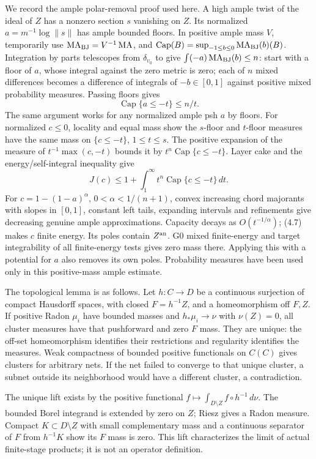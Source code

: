 \documentclass[
  10pt,
]{article}
\begin{document}
We record the ample polar-removal proof used here. A high ample twist of
the ideal of \(Z\) has a nonzero section \(s\) vanishing on \(Z\). Its
normalized \(a=m^{-1}\log\|s\|\) has ample bounded floors. In positive
ample mass \(V\), temporarily use
\(\operatorname{MA}_{\rm BJ}=V^{-1}\operatorname{MA}\), and
\(\operatorname{Cap}(B)=\sup_{-1\le b\le0}\operatorname{MA}_{\rm BJ}(b)(B)\).
Integration by parts telescopes from \(\delta_{v_0}\) to give
\(\int(-a)\operatorname{MA}_{\rm BJ}(b)\le n\): start with a floor of
\(a\), whose integral against the zero metric is zero; each of \(n\)
mixed differences becomes a difference of integrals of \(-b\in[0,1]\)
against positive mixed probability measures. Passing floors gives
\[\operatorname{Cap}\{a\le-t\}\le n/t. \tag{4.6}\] The same argument
works for any normalized ample psh \(a\) by floors. For normalized
\(c\le0\), locality and equal mass show the \(s\)-floor and \(t\)-floor
measures have the same mass on \(\{c\le-t\}\), \(1\le t\le s\). The
positive expansion of the measure of \(t^{-1}\max(c,-t)\) bounds it by
\(t^n\operatorname{Cap}\{c\le-t\}\). Layer cake and the
energy/self-integral inequality give
\[J(c)\le1+\int_1^\infty t^n\operatorname{Cap}\{c\le-t\}\,dt. \tag{4.7}\]
For \(c=1-(1-a)^\alpha\), \(0<\alpha<1/(n+1)\), convex increasing chord
majorants with slopes in \([0,1]\), constant left tails, expanding
intervals and refinements give decreasing genuine ample approximations.
Capacity decays as \(O(t^{-1/\alpha})\); (4.7) makes \(c\) finite
energy. Its poles contain \(Z^{\rm an}\). G0 mixed finite-energy and
target integrability of all finite-energy tests gives zero mass there.
Applying this with a potential for \(a\) also removes its own poles.
Probability measures have been used only in this positive-mass ample
estimate.

The topological lemma is as follows. Let \(h:C\to D\) be a continuous
surjection of compact Hausdorff spaces, with closed \(F=h^{-1}Z\), and a
homeomorphism off \(F,Z\). If positive Radon \(\mu_i\) have bounded
masses and \(h_*\mu_i\to\nu\) with \(\nu(Z)=0\), all cluster measures
have that pushforward and zero \(F\) mass. They are unique: the off-set
homeomorphism identifies their restrictions and regularity identifies
the measures. Weak compactness of bounded positive functionals on
\(C(C)\) gives clusters for arbitrary nets. If the net failed to
converge to that unique cluster, a subnet outside its neighborhood would
have a different cluster, a contradiction.

The unique lift exists by the positive functional
\(f\mapsto\int_{D\setminus Z}f\circ h^{-1}\,d\nu\). The bounded Borel
integrand is extended by zero on \(Z\); Riesz gives a Radon measure.
Compact \(K\subset D\setminus Z\) with small complementary mass and a
continuous separator of \(F\) from \(h^{-1}K\) show its \(F\) mass is
zero. This lift characterizes the limit of actual finite-stage products;
it is not an operator definition.
\end{document}
